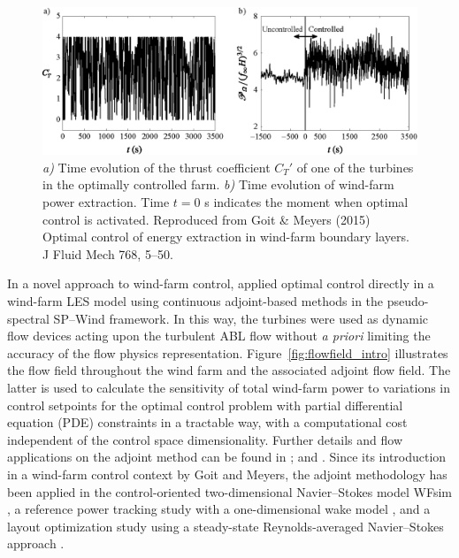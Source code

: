 \begin{figure}
	\includegraphics[width=\textwidth]{chapters/introduction/goit_meyers.eps}
	\caption{\emph{a)} Time evolution of the thrust coefficient $C_T'$ of one of the turbines in the optimally controlled farm. \emph{b)} Time evolution of wind-farm power extraction. Time $t = 0$ s indicates the moment when optimal control is activated. \label{fig:goitjfm} Reproduced from Goit \& Meyers (2015) Optimal control of energy extraction in wind-farm boundary layers. J Fluid Mech 768, 5--50. \label{fig:ct_power_goit}}
\end{figure}

In a novel approach to wind-farm control, \cite{goit2015optimal} applied optimal control directly in a wind-farm LES model using continuous adjoint-based methods in the pseudo-spectral SP--Wind framework. In this way, the turbines were used as dynamic flow devices acting upon the turbulent ABL flow without \emph{a priori} limiting the accuracy of the flow physics representation. Figure~\ref{fig:flowfield_intro} illustrates the flow field throughout the wind farm and the associated adjoint flow field. The latter is used to calculate the sensitivity of total wind-farm power to variations in control setpoints for the optimal control problem with partial differential equation (PDE) constraints in a tractable way, with a computational cost independent of the control space dimensionality. Further details and flow applications on the adjoint method can be found in \cite{giles2000introduction,bewley2001dns}; and \cite{troltzsch}. Since its introduction in a wind-farm control context by Goit and Meyers, the adjoint methodology has been applied in the control-oriented two-dimensional Navier--Stokes model WFsim \citep{boersma2016control,vali2016predictive}, a reference power tracking study with a one-dimensional wake model \citep{shapiro2017model}, and a layout optimization study using a steady-state Reynolds-averaged Navier--Stokes approach \citep{king2017optimization}.

